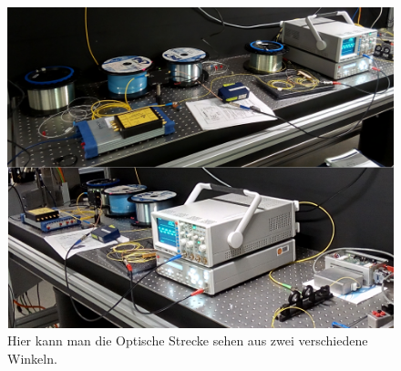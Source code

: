 \documentclass[a4paper]{article}
\begin{document}
\begin{figure}[H]
  \centering
  \includegraphics[scale=0.2]{./messungen/fos.png}
  \caption{Hier kann man die Optische Strecke sehen aus zwei verschiedene
  Winkeln.}
  \label{fig:fos}
\end{figure}
\end{document}
